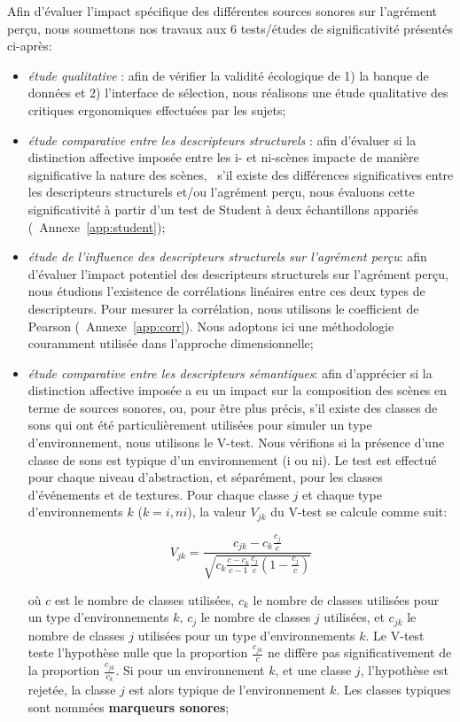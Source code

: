 Afin d'évaluer l'impact spécifique des différentes sources sonores sur l'agrément perçu, nous soumettons nos travaux aux 6 tests/études de significativité présentés ci-après:

\begin{itemize}
\item \emph{étude qualitative} : afin de vérifier la validité écologique de 1) la banque de données et 2) l'interface de sélection, nous réalisons une étude qualitative des critiques ergonomiques effectuées par les sujets;
\item \emph{étude comparative entre les descripteurs structurels} : afin d'évaluer si la distinction affective imposée entre les i- et ni-scènes impacte de manière significative la nature des scènes, \ie~s'il existe des différences significatives entre les descripteurs structurels et/ou l'agrément perçu, nous évaluons cette significativité à partir d'un test de Student à deux échantillons appariés (\cf~Annexe~\ref{app:student});
\item \emph{étude de l'influence des descripteurs structurels sur l'agrément perçu}: afin d'évaluer l'impact potentiel des descripteurs structurels sur l'agrément perçu, nous étudions l'existence de corrélations linéaires entre ces deux types de descripteurs. Pour mesurer la corrélation, nous utilisons le coefficient de Pearson (\cf~Annexe~\ref{app:corr}). Nous adoptons ici une méthodologie couramment utilisée dans l'approche dimensionnelle;
\item \emph{étude comparative entre les descripteurs sémantiques}: afin d'apprécier si la distinction affective imposée a eu un impact sur la composition des scènes en terme de sources sonores, ou, pour être plus précis, s'il existe des classes de sons qui ont été particulièrement utilisées pour simuler un type d'environnement, nous utilisons le V-test. Nous vérifions si la présence d'une classe de sons est typique d'un environnement (i ou ni). Le test est effectué pour chaque niveau d'abstraction, et séparément, pour les classes d'événements et de textures. Pour chaque classe $j$ et chaque type d'environnements $k$ ($k={i,ni}$), la valeur $V_{jk}$ du V-test se calcule comme suit: 

\begin{equation*}
V_{jk}=\dfrac{c_{jk}-c_k\frac{c_j}{c}}{\sqrt{c_k\frac{c-c_k}{c-1}\frac{c_j}{c}(1-\frac{c_j}{c})}}
\end{equation*}

où $c$ est le nombre de classes utilisées, $c_k$ le nombre de classes utilisées pour un type d'environnements $k$, $c_j$ le nombre de classes $j$ utilisées, et $c_{jk}$ le nombre de classes $j$ utilisées pour un type d'environnements $k$. Le V-test teste l'hypothèse nulle que la proportion $\frac{c_{jk}}{c}$ ne diffère pas significativement de la proportion $\frac{c_{jk}}{c_k}$. Si pour un environnement $k$, et une classe $j$, l'hypothèse est rejetée, la classe $j$ est alors typique de l'environnement $k$. Les classes typiques sont nommées \textbf{marqueurs sonores};


\end{itemize}
